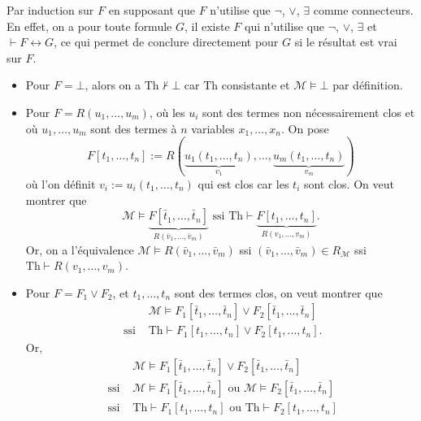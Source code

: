 \documentclass[./main]{subfiles}
\begin{document}
  \begin{prv}
    Par induction sur $F$ en supposant que $F$ n'utilise que $\lnot$, $\lor$,  $\exists$ comme connecteurs.
    En effet, on a pour toute formule $G$, il existe $F$ qui n'utilise que $\lnot$,  $\lor$,  $\exists$ et  $\vdash F \leftrightarrow G$, ce qui permet de conclure directement pour $G$ si le résultat est vrai sur $F$.

    \begin{itemize}
      \item  Pour $F = \bot$, alors on a $\mathrm{Th} \nvdash \bot$ car $\mathrm{Th}$ consistante et $\mathcal{M} \models \bot$ par définition.
      \item Pour $F = R(u_1, \ldots, u_m)$, où les $u_i$ sont des termes non nécessairement clos 
        et où $u_1, \ldots, u_m$ sont des termes à $n$ variables $x_1, \ldots, x_n$.
        On pose \[
          F[t_1, \ldots, t_n] := R(\underbrace{u_1(t_1, \ldots, t_n)}_{v_1}, \ldots, \underbrace{u_m(t_1, \ldots, t_n)}_{v_m})
        \] 
        où l'on définit $v_i := u_i(t_1, \ldots, t_n)$ qui est clos car les $t_i$ sont clos.
        On veut montrer que \[
          \mathcal{M} \models \underbrace{F[\bar{t}_1, \ldots, \bar{t}_n]}_{R(\bar{v}_1, \ldots, \bar{v}_m)} \text{ ssi }
          \mathrm{Th} \vdash \underbrace{F[t_1, \ldots, t_n]}_{R(v_1, \ldots, v_m)}
        .\]
        Or, on a l'équivalence $\mathcal{M} \models R(\bar{v}_1, \ldots, \bar{v}_m)$ ssi $(\bar{v}_1, \ldots, \bar{v}_m) \in R_{\mathcal{M}}$ ssi $\mathrm{Th} \vdash R(v_1, \ldots, v_m)$.
      \item Pour $F = F_1 \lor F_2$, et  $t_1, \ldots, t_n$ sont des termes clos, on veut montrer que 
        \begin{align*}
          &\mathcal{M} \models F_1[\bar{t}_1, \ldots, \bar{t}_n] \lor  F_2[\bar{t}_1, \ldots, \bar{t}_n]\\
          \text{ ssi }&
          \mathrm{Th} \vdash F_1[t_1, \ldots, t_n] \lor  F_2[t_1, \ldots, t_n]
        .\end{align*}
        Or,
        \begin{align*}
          &\mathcal{M} \models F_1[\bar{t}_1, \ldots, \bar{t}_n] \lor  F_2[\bar{t}_1, \ldots, \bar{t}_n] \\
          \text{ ssi }& \mathcal{M} \models F_1[\bar{t}_1, \ldots, \bar{t}_n] \text{ ou } \mathcal{M} \models F_2[\bar{t}_1, \ldots, \bar{t}_n]\\
          \text{ ssi }& \mathrm{Th} \vdash F_1[t_1, \ldots, t_n] \text{ ou } \mathrm{Th} \vdash F_2[t_1, \ldots, t_n]

\end{align*}
\end{itemize}
\end{prv}
\end{document}
